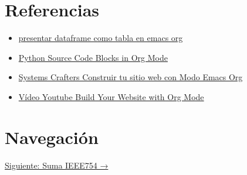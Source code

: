 \documentclass[11pt]{article}
\begin{document}
\section{Referencias}
\label{sec:org19246d9}
\begin{itemize}
\item \href{https://emacs.stackexchange.com/questions/28715/get-pandas-data-frame-as-a-table-in-org-babel}{presentar dataframe como tabla en emacs org}
\item \href{https://orgmode.org/worg/org-contrib/babel/languages/ob-doc-python.html}{Python Source Code Blocks in Org Mode}
\item \href{https://systemcrafters.net/publishing-websites-with-org-mode/building-the-site/}{Systems Crafters Construir tu sitio web con Modo Emacs Org}
\item \href{https://www.youtube.com/watch?v=AfkrzFodoNw}{Vídeo Youtube Build Your Website with Org Mode}
\end{itemize}
\section{Navegación}
\label{sec:orge5b724e}

\href{pag2-sumaieee754.org}{Siguiente: Suma IEEE754 →}
\end{document}
